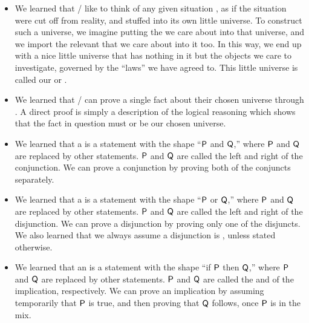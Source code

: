 \documentclass[../../../main.tex]{subfiles}
\begin{document}
\begin{itemize}
  
  \item We learned that \mathers/ like to think of any given situation , as if the situation were cut off from reality, and stuffed into its own little universe. To construct such a universe, we imagine putting the  we care about into that universe, and we import the relevant  that we care about into it too. In this way, we end up with a nice little universe that has nothing in it but the objects we care to investigate, governed by the ``laws'' we have agreed to. This little universe is called our  or .
  
  \item We learned that \mathers/ can prove a single fact about their chosen universe through . A direct proof is simply a description of the logical reasoning which shows that the fact in question must  or be  our chosen universe.
  
  \item We learned that a  is a statement with the shape ``$\P/$ and $\Q/$,'' where $\P/$ and $\Q/$ are replaced by other statements. $\P/$ and $\Q/$ are called the left and right  of the conjunction. We can prove a conjunction by proving both of the conjuncts separately.
  
  \item We learned that a  is a statement with the shape ``$\P/$ or $\Q/$,'' where $\P/$ and $\Q/$ are replaced by other statements. $\P/$ and $\Q/$ are called the left and right  of the disjunction. We can prove a disjunction by proving only one of the disjuncts. We also learned that we always assume a disjunction is , unless stated otherwise.
  
  \item We learned that an  is a statement with the shape ``if $\P/$ then $\Q/$,'' where $\P/$ and $\Q/$ are replaced by other statements. $\P/$ and $\Q/$ are called the  and  of the implication, respectively. We can prove an implication by assuming temporarily that $\P/$ is true, and then proving that $\Q/$ follows, once $\P/$ is in the mix.
  
\end{itemize}
\end{document}
